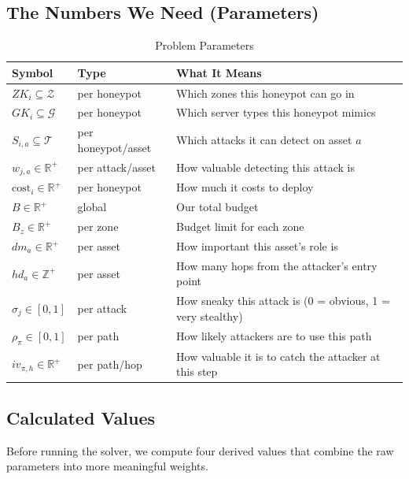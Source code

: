 \documentclass[journal]{IEEEtran}
\newcommand{\calT}{\mathcal{T}}
\newcommand{\calZ}{\mathcal{Z}}
\newcommand{\calG}{\mathcal{G}}
\begin{document}
\subsection{The Numbers We Need (Parameters)}

\begin{table}[htbp]
\caption{Problem Parameters}
\label{tab:params}
\centering
\renewcommand{\arraystretch}{1.2}
\begin{tabular}{@{}lll@{}}
\toprule
\textbf{Symbol} & \textbf{Type} & \textbf{What It Means} \\
\midrule
$ZK_i \subseteq \calZ$        & per honeypot & Which zones this honeypot can go in \\
$GK_i \subseteq \calG$        & per honeypot & Which server types this honeypot mimics \\
$S_{i,a} \subseteq \calT$     & per honeypot/asset & Which attacks it can detect on asset $a$ \\
$w_{j,a} \in \mathbb{R}^+$    & per attack/asset & How valuable detecting this attack is \\
$\mathrm{cost}_i \in \mathbb{R}^+$ & per honeypot & How much it costs to deploy \\
$B \in \mathbb{R}^+$          & global & Our total budget \\
$B_z \in \mathbb{R}^+$        & per zone & Budget limit for each zone \\
$dm_a \in \mathbb{R}^+$       & per asset & How important this asset's role is \\
$hd_a \in \mathbb{Z}^+$       & per asset & How many hops from the attacker's entry point \\
$\sigma_j \in [0,1]$          & per attack & How sneaky this attack is (0 = obvious, 1 = very stealthy) \\
$\rho_\pi \in [0,1]$          & per path & How likely attackers are to use this path \\
$iv_{\pi,h} \in \mathbb{R}^+$ & per path/hop & How valuable it is to catch the attacker at this step \\
\bottomrule
\end{tabular}
\end{table}

\subsection{Calculated Values}

Before running the solver, we compute four derived values that
combine the raw parameters into more meaningful weights.
\end{document}
